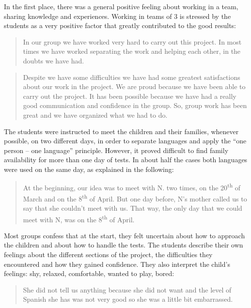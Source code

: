 \documentclass[output=paper]{../langscibook}
\begin{document}


In the first place, there was a general positive feeling about working in a team, sharing knowledge and experiences. Working in teams of 3 is stressed by the students as a very positive factor that greatly contributed to the good results:

\begin{quote}
 In our group we have worked very hard to carry out this project. In most times we have worked separating the work and helping each other, in the doubts we have had.
\end{quote}

\begin{quote}
Despite we have some difficulties we have had some greatest satisfactions about our work in the project. We are proud because we have been able to carry out the project. It has been possible because we have had a really good communication and confidence in the group. So, group work has been great and we have organized what we had to do. 
\end{quote}

The students were instructed to meet the children and their families, whenever possible, on two different days, in order to separate languages and apply the “one person – one language” principle. However, it proved difficult to find family availability for more than one day of tests. In about half the cases both languages were used on the same day, as explained in the following:

\begin{quote}
At the beginning, our idea was to meet with N. two times, on the 20\textsuperscript{th} of March and on the 8\textsuperscript{th} of April. But one day before, N’s mother called us to say that she couldn’t meet with us. That way, the only day that we could meet with N, was on the 8\textsuperscript{th} of April.
\end{quote}

Most groups confess that at the start, they felt uncertain about how to approach the children and about how to handle the tests. The students describe their own feelings about the different sections of the project, the difficulties they encountered and how they gained confidence. They also interpret the child’s feelings: shy, relaxed, comfortable, wanted to play, bored:

\begin{quote}
She did not tell us anything because she did not want and the level of Spanish she has was not very good so she was a little bit embarrassed.
\end{quote}
\end{document}
